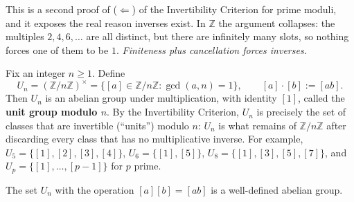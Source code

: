 \documentclass[11pt]{report}
\begin{document}
\begin{rembox}\label{rem:finiteness-plus-cancellation}
This is a second proof of ($\Leftarrow$) of the Invertibility Criterion for prime moduli, and it exposes the real reason inverses exist. In $\mathbb{Z}$ the argument collapses: the multiples $2, 4, 6, \ldots$ are all distinct, but there are infinitely many slots, so nothing forces one of them to be $1$. \emph{Finiteness plus cancellation forces inverses.}
\end{rembox}

\begin{defbox}[{The Unit Group $(\mathbb{Z}/n\mathbb{Z})^\times = U_n$}]\label{def:unit-group-z-nz-x-un}
Fix an integer $n \geq 1$. Define
\[ U_n = (\mathbb{Z}/n\mathbb{Z})^\times = \{[a] \in \mathbb{Z}/n\mathbb{Z} : \gcd(a, n) = 1\}, \qquad [a] \cdot [b] := [ab]. \]
Then $U_n$ is an abelian group under multiplication, with identity $[1]$, called the \textbf{unit group modulo $n$}. By the Invertibility Criterion, $U_n$ is precisely the set of classes that are invertible (``units'') modulo $n$: $U_n$ is what remains of $\mathbb{Z}/n\mathbb{Z}$ after discarding every class that has no multiplicative inverse. For example, $U_5 = \{[1],[2],[3],[4]\}$, $U_6 = \{[1],[5]\}$, $U_8 = \{[1],[3],[5],[7]\}$, and $U_p = \{[1], \ldots, [p-1]\}$ for $p$ prime.
\end{defbox}

\begin{propbox}[{$U_n$ Is a Group}]\label{prop:un-group}
The set $U_n$ with the operation $[a][b] = [ab]$ is a well-defined abelian group.
\end{propbox}
\end{document}
